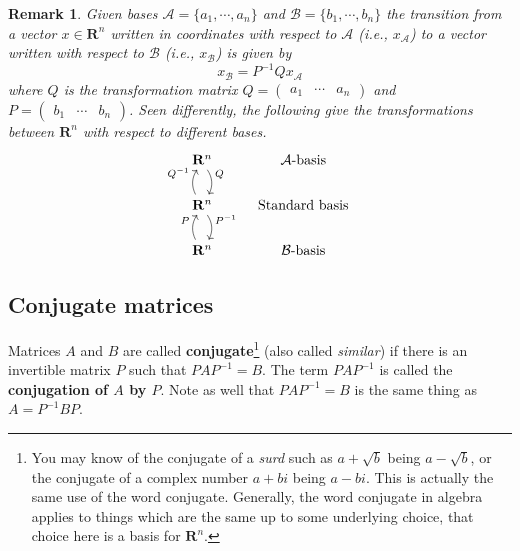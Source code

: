 \documentclass[12pt]{article}
\numberwithin{equation}{subsection}
\numberwithin{figure}{subsection}
\theoremstyle{note}
\newtheorem{remark}[subsection]{Remark}
\newcommand{\R}{\mathbf{R}}
\begin{document}
\begin{remark}Given bases $\mathcal{A}=\{a_1,\cdots,a_n\}$ and $\mathcal{B}=\{b_1,\cdots,b_n\}$ the transition from a vector $x\in\mathbf{R}^n$ written in coordinates with respect to $\mathcal{A}$ (i.e., $x_{\mathcal{A}}$) to a vector written with respect to $\mathcal{B}$ (i.e., $x_{\mathcal{B}}$) is given by \begin{equation} \label{eq-change-basis} x_{\mathcal{B}}=P^{-1}Qx_{\mathcal{A}}\end{equation} where $Q$ is the transformation matrix $Q=\begin{pmatrix} a_1 & \cdots & a_n\end{pmatrix}$ and $P=\begin{pmatrix} b_1 & \cdots & b_n\end{pmatrix}$. Seen differently, the following give the transformations between $\R^n$ with respect to different bases. 
\begin{equation}
 \begin{tikzcd} \R^n \arrow[bend left]{d}{Q} & \text{$\mathcal{A}$-basis} \\ 
 \R^n \arrow[bend left]{d}{P^{-1}} \arrow[bend left]{u}{Q^{-1}} & \text{Standard basis} \\  
 \R^n  \arrow[bend left]{u}{P} & \text{$\mathcal{B}$-basis} 
 \end{tikzcd} \end{equation}
\end{remark}

\subsection{Conjugate matrices}

Matrices $A$ and $B$ are called \textbf{conjugate}\footnote{You may know of the conjugate of a \textit{surd} such as $a+\sqrt{b}$ being $a-\sqrt{b}$, or the conjugate of a complex number $a+bi$ being $a-bi$. This is actually the same use of the word conjugate. Generally, the word conjugate in algebra applies to things which are the same up to some underlying choice, that choice here is a basis for $\R^n$. } (also called \textit{similar}) if there is an invertible matrix $P$ such that $PAP^{-1}=B$. The term $PAP^{-1}$ is called the \textbf{conjugation of $A$ by $P$}. Note as well that $PAP^{-1}=B$ is the same thing as $A=P^{-1}BP$.
\end{document}
